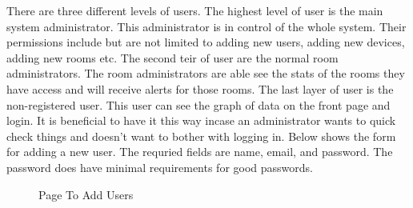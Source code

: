 \documentclass{report}
\begin{document}
There are three different levels of users.
The highest level of user is the main system administrator.
This administrator is in control of the whole system. 
Their permissions include but are not limited to adding new users, adding new devices, adding new rooms etc. 
The second teir of user are the normal room administrators.
The room administrators are able see the stats of the rooms they have access and will receive alerts for those rooms.
The last layer of user is the non-registered user. 
This user can see the graph of data on the front page and login. 
It is beneficial to have it this way incase an administrator wants to quick check things and doesn't want to bother with logging in.
Below shows the form for adding a new user. The requried fields are name, email, and password. 
The password does have minimal requirements for good passwords.
\begin{figure}[H]
\caption{Page To Add Users}
\end{figure}
\end{document}
